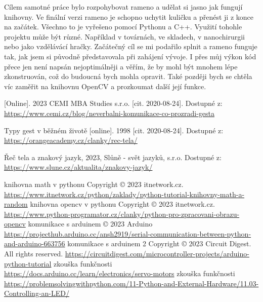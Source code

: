 \documentclass[12pt, a4paper,
twoside,        %
openright
]{report}
\begin{document}
{	Cílem samotné práce bylo rozpohybovat rameno a udělat si jasno jak fungují knihovny. Ve finální verzi rameno je schopno uchytit kuličku a přenést ji z konce na začátek. Všechno to je vyřešeno pomocí Pythonu a C++. Využití tohohle projektu může být různé. Například v továrnách, ve skladech, v nanochirurgii nebo jako vzdělávácí hračky. Začátečný cíl se mi podařilo splnit a rameno funguje tak, jak jsem si původně představovala při zahájení vývoje. I přes můj výkon kód přece jen není napsán nejoptimálněji a věřím, že by mohl být mnohem lépe zkonstruován, což do budoucná bych mohla opravit. Také později bych se chtěla víc zaměřit na knihovnu OpenCV a prozkoumat další její funkce. 

	
	\renewcommand\bibname{Literatura}
	\begin{thebibliography}{99}
		 [Online].  2023 CEMI MBA Studies s.r.o. [cit. 2020-08-24]. Dostupné z: \url{https://www.cemi.cz/blog/neverbalni-komunikace-co-prozradi-gesta}
		
		 {Typy gest v běžném životě} [online]. 1998 [cit. 2020-08-24]. Dostupné z: \url{https://orangeacademy.cz/clanky/rec-tela/}
		
		 Řeč tela a znakový jazyk, 2023, Slůně - svět jazyků, s.r.o. Dostupné z: \url{https://www.slune.cz/aktualita/znakovy-jazyk/}
		
		 knihovna math v pythonu Copyright © 2023 itnetwork.cz.
	 \url{https://www.itnetwork.cz/python/zaklady/python-tutorial-knihovny-math-a-random}
	 	 knihovna opencv v pythonu Copyright © 2023 itnetwork.cz.
	 \url{https://www.python-programator.cz/clanky/python-pro-zpracovani-obrazu-opencv}
	  komunikace s arduinem  © 2023 Arduino
	 \url{https://projecthub.arduino.cc/ansh2919/serial-communication-between-python-and-arduino-663756}
	 komunikace s arduinem 2 Copyright © 2023 Circuit Digest. All rights reserved.
	 \url{https://circuitdigest.com/microcontroller-projects/arduino-python-tutorial}
	  zkouška funkčnosti 
	 \url{https://docs.arduino.cc/learn/electronics/servo-motors}
	  zkouška funkčnosti 
	 \url{https://problemsolvingwithpython.com/11-Python-and-External-Hardware/11.03-Controlling-an-LED/}
	 
	 
	 
		
		

\end{thebibliography}}
\end{document}
